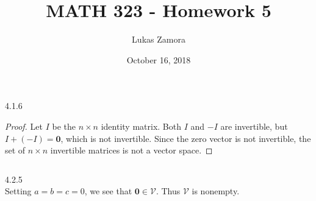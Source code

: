 \documentclass{article}
\title{MATH 323 - Homework 5}
\author{Lukas Zamora}
\date{October 16, 2018}
\theoremstyle{definition}
\begin{document}
    \maketitle

    \begin{prob}{4.1.6} $ $
        \begin{proof}
            Let $I$ be the $n\times n$ identity matrix. Both $I$ and $-I$ are invertible, but $I+(-I) = \mathbf{0}$, which is not invertible. Since the zero vector is not invertible, the set of $ n\times n $ invertible matrices is not a vector space.
        \end{proof}
    $  $
    \end{prob}

    \begin{prob}{4.2.5} $ $ \vspace{2mm} \\
    	Setting $ a=b=c=0 $, we see that $ \mathbf{0} \in \mathcal{V} $. Thus $ \mathcal{V} $ is nonempty.\\
    	

\end{prob}
\end{document}
